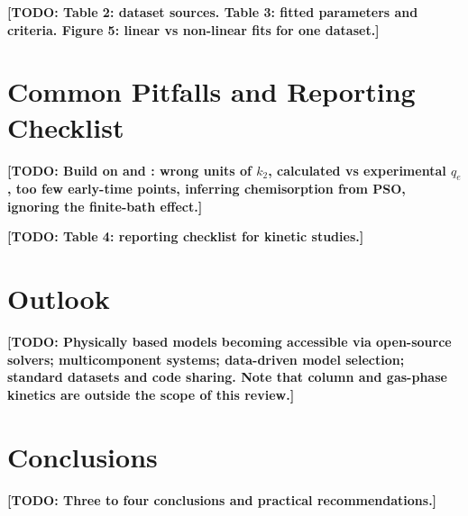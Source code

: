 \documentclass[11pt,a4paper]{article}
\newcommand{\todo}[1]{\textbf{[TODO: #1]}}
\begin{document}
\todo{Table 2: dataset sources. Table 3: fitted parameters and criteria.
Figure 5: linear vs non-linear fits for one dataset.}

\section{Common Pitfalls and Reporting Checklist}
\label{sec:pitfalls}

\todo{Build on \textcite{Tran2017_AdsorptionMistakes} and
\textcite{Wang2020_KineticModels}: wrong units of $k_2$, calculated vs
experimental $q_e$, too few early-time points, inferring chemisorption from
PSO, ignoring the finite-bath effect.}

\todo{Table 4: reporting checklist for kinetic studies.}

\section{Outlook}
\label{sec:outlook}

\todo{Physically based models becoming accessible via open-source solvers;
multicomponent systems; data-driven model selection; standard datasets and
code sharing. Note that column and gas-phase kinetics are outside the
scope of this review.}

\section{Conclusions}
\label{sec:conclusions}

\todo{Three to four conclusions and practical recommendations.}
\end{document}
